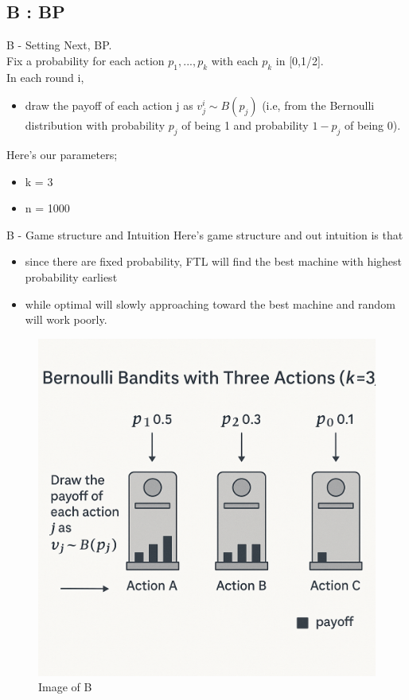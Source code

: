 \documentclass{beamer}
\begin{document}
\subsection{B : BP}

\begin{frame}{B - Setting}
    Next, BP.\\
    Fix a probability for each action $p_{1},...,p_{k}$ with each $p_{k}$ in [0,1/2].\\
    In each round i,
    \begin{itemize}
        \item draw the payoff of each action j as $v^{i}_{j} \sim B(p_{j})$ (i.e, from the Bernoulli distribution with probability $p_j$ of being 1 and probability $1-p_{j}$ of being 0).
    \end{itemize}
    \vspace{1em}
    Here's our parameters;
    \begin{itemize}
        \item k = 3
        \item n = 1000
    \end{itemize}
\end{frame}

\begin{frame}{B - Game structure and Intuition}
    Here's game structure and out intuition is that 
    \begin{itemize}
        \item since there are fixed probability, FTL will find the best machine with highest probability earliest
        \item while optimal will slowly approaching toward the best machine and random will work poorly.
    \end{itemize}
    \begin{figure}
        \centering
        \includegraphics[width=0.4\linewidth]{332Project2//figures/Image_B.png}
        \caption{Image of B}
        \label{fig:placeholder}
    \end{figure}
\end{frame}
\end{document}
